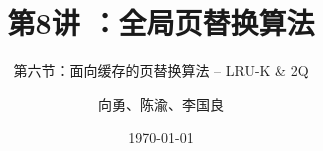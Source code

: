 



\title[第8讲]{第8讲 ：全局页替换算法} %
\subtitle{第六节：面向缓存的页替换算法 -- LRU-K \& 2Q}
\author{向勇、陈渝、李国良} %
\date{\today} %




\begin{frame}
\titlepage %
\end{frame}

%

